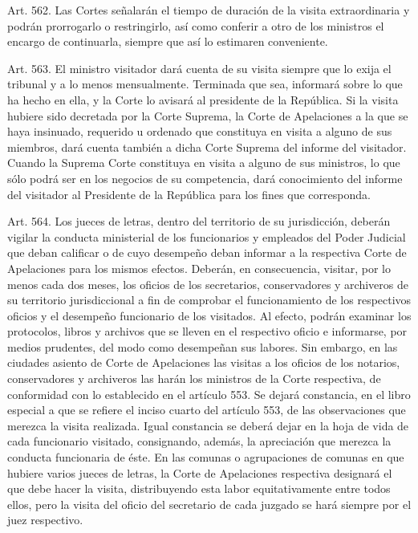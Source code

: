     Art. 562. Las Cortes señalarán el tiempo de duración de la visita extraordinaria y podrán prorrogarlo o restringirlo, así como conferir a otro de los ministros el encargo de continuarla, siempre que así lo estimaren conveniente.

    Art. 563. El ministro visitador dará cuenta de su visita siempre que lo exija el tribunal y a lo menos mensualmente. Terminada que sea, informará sobre lo que ha hecho en ella, y la Corte lo avisará al presidente de la República.
    Si la visita hubiere sido decretada por la Corte Suprema, la Corte de Apelaciones a la que se haya insinuado, requerido u ordenado que constituya en visita a alguno de sus miembros, dará cuenta también a dicha Corte Suprema del informe del visitador.
    Cuando la Suprema Corte constituya en visita a alguno de sus ministros, lo que sólo podrá ser en los negocios de su competencia, dará conocimiento del informe del visitador al Presidente de la República para los fines que corresponda.


    Art. 564. Los jueces de letras, dentro del territorio de su jurisdicción, deberán vigilar la conducta ministerial de los funcionarios y empleados del Poder Judicial que deban calificar o de cuyo desempeño deban informar a la respectiva Corte de Apelaciones para los mismos efectos. Deberán, en consecuencia, visitar, por lo menos cada dos meses, los oficios de los secretarios, conservadores y archiveros de su territorio jurisdiccional a fin de comprobar el funcionamiento de los respectivos oficios y el desempeño funcionario de los visitados. Al efecto, podrán examinar los protocolos, libros y archivos que se lleven en el respectivo oficio e informarse, por medios prudentes, del modo como desempeñan sus labores.
    Sin embargo, en las ciudades asiento de Corte de Apelaciones las visitas a los oficios de los notarios, conservadores y archiveros las harán los ministros de la Corte respectiva, de conformidad con lo establecido en el artículo 553.
    Se dejará constancia, en el libro especial a que se refiere el inciso cuarto del artículo 553, de las observaciones que merezca la visita realizada. Igual constancia se deberá dejar en la hoja de vida de cada funcionario visitado, consignando, además, la apreciación que merezca la conducta funcionaria de éste.
    En las comunas o agrupaciones de comunas en que hubiere varios jueces de letras, la Corte de Apelaciones respectiva designará el que debe hacer la visita, distribuyendo esta labor equitativamente entre todos ellos, pero la visita del oficio del secretario de cada juzgado se hará siempre por el juez respectivo.



